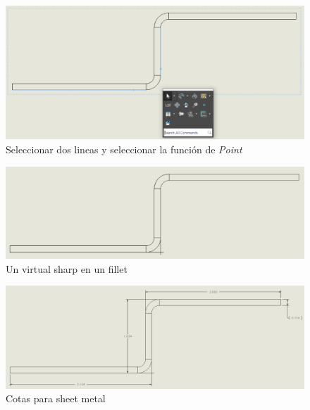 \documentclass{report}
\begin{document}
\begin{figure}[H]
	\centering
	\includegraphics[width=0.95\linewidth, height=0.5\textheight,keepaspectratio]{Imagenes/solidworks_virtual_sharps01}
	\caption{Seleccionar dos lineas y seleccionar la función de \emph{Point}}
	\label{fig:solidworksvirtualsharps01}
\end{figure}

\begin{figure}[H]
	\centering
	\includegraphics[width=0.95\linewidth, height=0.5\textheight,keepaspectratio]{Imagenes/solidworks_virtual_sharps02}
	\caption{Un virtual sharp en un fillet}
	\label{fig:solidworksvirtualsharps02}
\end{figure}


\begin{figure}[H]
	\centering
	\includegraphics[width=0.95\linewidth, height=0.5\textheight,keepaspectratio]{Imagenes/solidworks_virtual_sharps03}
	\caption{Cotas para sheet metal}
	\label{fig:solidworksvirtualsharps03}
\end{figure}
\end{document}
